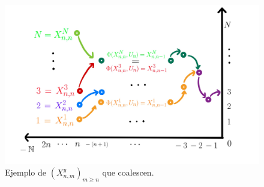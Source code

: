 \documentclass[letterpaper,11pt]{article} %
\theoremstyle{defbreak}
\theoremstyle{propbreak}
\theoremstyle{remark}
\theoremstyle{break}
\def\N{\mathbb{N}}
\begin{document}
\begin{figure}
    \centering
    \includegraphics[scale=0.16]{img/clase_12_pag_9.jpg}
    \caption{Ejemplo de $(X^y_{n,m})_{m\geq n}$ que coalescen.}
    \label{fig:past}
\end{figure}

\end{document}

